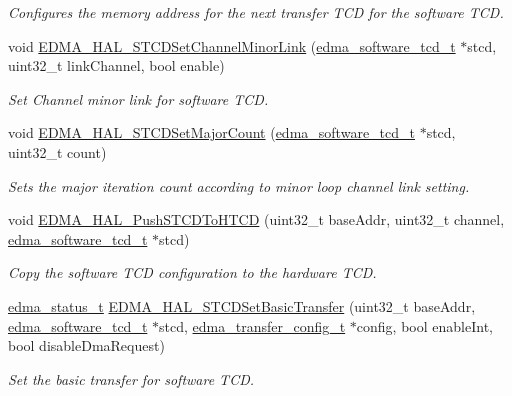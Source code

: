 \begin{DoxyCompactItemize}
\begin{DoxyCompactList}\small\item\em Configures the memory address for the next transfer T\+CD for the software T\+CD. \end{DoxyCompactList}\item 
void \hyperlink{group__edma__hal_ga36f154763e1214f033074a068ac9e242}{E\+D\+M\+A\+\_\+\+H\+A\+L\+\_\+\+S\+T\+C\+D\+Set\+Channel\+Minor\+Link} (\hyperlink{group__edma__hal_ga7cc4084521c106d714c925fddff92b40}{edma\+\_\+software\+\_\+tcd\+\_\+t} $\ast$stcd, uint32\+\_\+t link\+Channel, bool enable)
\begin{DoxyCompactList}\small\item\em Set Channel minor link for software T\+CD. \end{DoxyCompactList}\item 
void \hyperlink{group__edma__hal_ga8f60631b84702a9acbd980d1946175a2}{E\+D\+M\+A\+\_\+\+H\+A\+L\+\_\+\+S\+T\+C\+D\+Set\+Major\+Count} (\hyperlink{group__edma__hal_ga7cc4084521c106d714c925fddff92b40}{edma\+\_\+software\+\_\+tcd\+\_\+t} $\ast$stcd, uint32\+\_\+t count)
\begin{DoxyCompactList}\small\item\em Sets the major iteration count according to minor loop channel link setting. \end{DoxyCompactList}\item 
void \hyperlink{group__edma__hal_ga8eea4fc26c17b9adf2cf3a0e9d3f25f4}{E\+D\+M\+A\+\_\+\+H\+A\+L\+\_\+\+Push\+S\+T\+C\+D\+To\+H\+T\+CD} (uint32\+\_\+t base\+Addr, uint32\+\_\+t channel, \hyperlink{group__edma__hal_ga7cc4084521c106d714c925fddff92b40}{edma\+\_\+software\+\_\+tcd\+\_\+t} $\ast$stcd)
\begin{DoxyCompactList}\small\item\em Copy the software T\+CD configuration to the hardware T\+CD. \end{DoxyCompactList}\item 
\hyperlink{group__edma__hal_gaba9351bb5972d15c73f14ba9bb507796}{edma\+\_\+status\+\_\+t} \hyperlink{group__edma__hal_ga462868ae1efe70dfefdf95cb737480ce}{E\+D\+M\+A\+\_\+\+H\+A\+L\+\_\+\+S\+T\+C\+D\+Set\+Basic\+Transfer} (uint32\+\_\+t base\+Addr, \hyperlink{group__edma__hal_ga7cc4084521c106d714c925fddff92b40}{edma\+\_\+software\+\_\+tcd\+\_\+t} $\ast$stcd, \hyperlink{group__edma__hal_ga01fdc7ba04e6c4187630c6480746c40d}{edma\+\_\+transfer\+\_\+config\+\_\+t} $\ast$config, bool enable\+Int, bool disable\+Dma\+Request)
\begin{DoxyCompactList}\small\item\em Set the basic transfer for software T\+CD. \end{DoxyCompactList}\end{DoxyCompactItemize}


